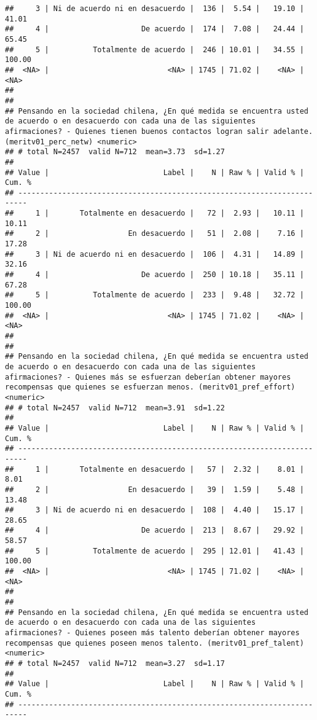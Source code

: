 \documentclass[
  10,
  landscape,
  legalpaper]{article}
\begin{document}
\begin{verbatim}
##     3 | Ni de acuerdo ni en desacuerdo |  136 |  5.54 |   19.10 |  41.01
##     4 |                     De acuerdo |  174 |  7.08 |   24.44 |  65.45
##     5 |          Totalmente de acuerdo |  246 | 10.01 |   34.55 | 100.00
##  <NA> |                           <NA> | 1745 | 71.02 |    <NA> |   <NA>
## 
## 
## Pensando en la sociedad chilena, ¿En qué medida se encuentra usted de acuerdo o en desacuerdo con cada una de las siguientes afirmaciones? - Quienes tienen buenos contactos logran salir adelante. (meritv01_perc_netw) <numeric>
## # total N=2457  valid N=712  mean=3.73  sd=1.27
## 
## Value |                          Label |    N | Raw % | Valid % | Cum. %
## ------------------------------------------------------------------------
##     1 |       Totalmente en desacuerdo |   72 |  2.93 |   10.11 |  10.11
##     2 |                  En desacuerdo |   51 |  2.08 |    7.16 |  17.28
##     3 | Ni de acuerdo ni en desacuerdo |  106 |  4.31 |   14.89 |  32.16
##     4 |                     De acuerdo |  250 | 10.18 |   35.11 |  67.28
##     5 |          Totalmente de acuerdo |  233 |  9.48 |   32.72 | 100.00
##  <NA> |                           <NA> | 1745 | 71.02 |    <NA> |   <NA>
## 
## 
## Pensando en la sociedad chilena, ¿En qué medida se encuentra usted de acuerdo o en desacuerdo con cada una de las siguientes afirmaciones? - Quienes más se esfuerzan deberían obtener mayores recompensas que quienes se esfuerzan menos. (meritv01_pref_effort) <numeric>
## # total N=2457  valid N=712  mean=3.91  sd=1.22
## 
## Value |                          Label |    N | Raw % | Valid % | Cum. %
## ------------------------------------------------------------------------
##     1 |       Totalmente en desacuerdo |   57 |  2.32 |    8.01 |   8.01
##     2 |                  En desacuerdo |   39 |  1.59 |    5.48 |  13.48
##     3 | Ni de acuerdo ni en desacuerdo |  108 |  4.40 |   15.17 |  28.65
##     4 |                     De acuerdo |  213 |  8.67 |   29.92 |  58.57
##     5 |          Totalmente de acuerdo |  295 | 12.01 |   41.43 | 100.00
##  <NA> |                           <NA> | 1745 | 71.02 |    <NA> |   <NA>
## 
## 
## Pensando en la sociedad chilena, ¿En qué medida se encuentra usted de acuerdo o en desacuerdo con cada una de las siguientes afirmaciones? - Quienes poseen más talento deberían obtener mayores recompensas que quienes poseen menos talento. (meritv01_pref_talent) <numeric>
## # total N=2457  valid N=712  mean=3.27  sd=1.17
## 
## Value |                          Label |    N | Raw % | Valid % | Cum. %
## ------------------------------------------------------------------------

\end{verbatim}
\end{document}
